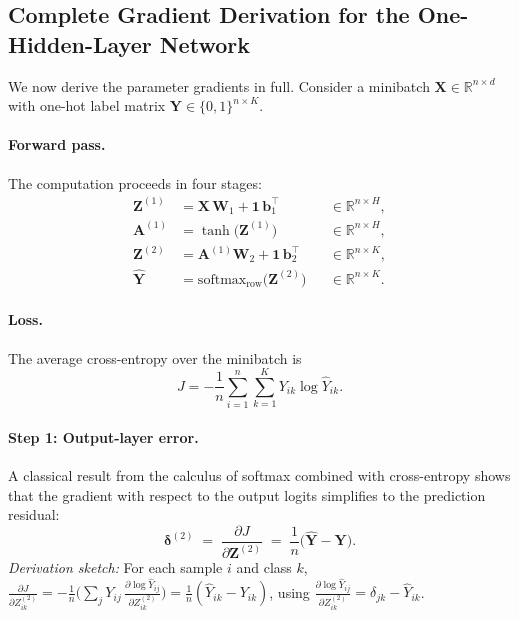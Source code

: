 \documentclass[11pt]{article}
\newcommand{\R}{\mathbb{R}}
\newcommand{\bX}{\mathbf{X}}
\newcommand{\bW}{\mathbf{W}}
\newcommand{\bb}{\mathbf{b}}
\newcommand{\bY}{\mathbf{Y}}
\newcommand{\bZ}{\mathbf{Z}}
\newcommand{\bA}{\mathbf{A}}
\newcommand{\bone}{\mathbf{1}}
\begin{document}
\subsection{Complete Gradient Derivation for the One-Hidden-Layer Network}
\label{sec:gradient-derivation}

We now derive the parameter gradients in full.
Consider a minibatch $\bX\in\R^{n\times d}$ with one-hot label matrix $\bY\in\{0,1\}^{n\times K}$.

\paragraph{Forward pass.}
The computation proceeds in four stages:
\begin{align}
  \bZ^{(1)} &= \bX\,\bW_1 + \bone\,\bb_1^\top
    & &\in\R^{n\times H}, \label{eq:fwd1}\\
  \bA^{(1)} &= \tanh\!\bigl(\bZ^{(1)}\bigr)
    & &\in\R^{n\times H}, \label{eq:fwd2}\\
  \bZ^{(2)} &= \bA^{(1)}\bW_2 + \bone\,\bb_2^\top
    & &\in\R^{n\times K}, \label{eq:fwd3}\\
  \hat{\bY}  &= \mathrm{softmax}_{\text{row}}\!\bigl(\bZ^{(2)}\bigr)
    & &\in\R^{n\times K}. \label{eq:fwd4}
\end{align}

\paragraph{Loss.}
The average cross-entropy over the minibatch is
\begin{equation}\label{eq:batch-ce}
  J = -\frac{1}{n}\sum_{i=1}^{n}\sum_{k=1}^{K} Y_{ik}\log\hat{Y}_{ik}.
\end{equation}

\paragraph{Step 1: Output-layer error.}
A classical result from the calculus of softmax combined with cross-entropy shows that the
gradient with respect to the output logits simplifies to the prediction residual:
\begin{equation}\label{eq:delta2}
  \boldsymbol{\delta}^{(2)}
  \;=\;\frac{\partial J}{\partial \bZ^{(2)}}
  \;=\;\frac{1}{n}\bigl(\hat{\bY}-\bY\bigr).
\end{equation}
\emph{Derivation sketch:} For each sample $i$ and class $k$,
$\frac{\partial J}{\partial Z^{(2)}_{ik}}
= -\frac{1}{n}\bigl(\sum_j Y_{ij}\,\frac{\partial\log\hat{Y}_{ij}}{\partial Z^{(2)}_{ik}}\bigr)
= \frac{1}{n}(\hat{Y}_{ik}-Y_{ik})$,
using $\frac{\partial\log\hat{Y}_{ij}}{\partial Z^{(2)}_{ik}}=\delta_{jk}-\hat{Y}_{ik}$.
\end{document}
